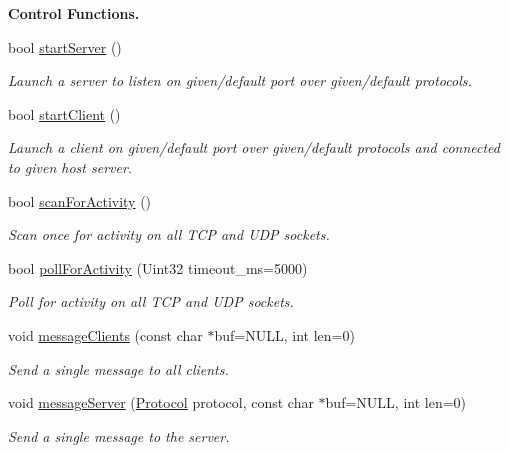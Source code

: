 \begin{Indent}{\bf Control Functions.}\par
\begin{DoxyCompactItemize}
\item 
bool \hyperlink{classNetManager_ae6a832ed2ede5f5407b75abc584269b8}{start\-Server} ()
\begin{DoxyCompactList}\small\item\em Launch a server to listen on given/default port over given/default protocols. \end{DoxyCompactList}\item 
bool \hyperlink{classNetManager_ab5b2ae812e37abbb03be5b604e34a60d}{start\-Client} ()
\begin{DoxyCompactList}\small\item\em Launch a client on given/default port over given/default protocols and connected to given host server. \end{DoxyCompactList}\item 
bool \hyperlink{classNetManager_a934ebfd8ca745a95263ba92c2ccf2b19}{scan\-For\-Activity} ()
\begin{DoxyCompactList}\small\item\em Scan once for activity on all T\-C\-P and U\-D\-P sockets. \end{DoxyCompactList}\item 
bool \hyperlink{classNetManager_ac213dda2e72556e53450d5b1e2057f22}{poll\-For\-Activity} (Uint32 timeout\-\_\-ms=5000)
\begin{DoxyCompactList}\small\item\em Poll for activity on all T\-C\-P and U\-D\-P sockets. \end{DoxyCompactList}\item 
void \hyperlink{classNetManager_a9cd49a87e94f25467cc8056e33c23dc5}{message\-Clients} (const char $\ast$buf=N\-U\-L\-L, int len=0)
\begin{DoxyCompactList}\small\item\em Send a single message to all clients. \end{DoxyCompactList}\item 
void \hyperlink{classNetManager_a8bcbcfe3c01917c2211b692cf6615177}{message\-Server} (\hyperlink{NetManager_8h_a9af285d1232beed01f31aac5d3a5469f}{Protocol} protocol, const char $\ast$buf=N\-U\-L\-L, int len=0)
\begin{DoxyCompactList}\small\item\em Send a single message to the server. \end{DoxyCompactList}\item 

\end{DoxyCompactItemize}
\end{Indent}

